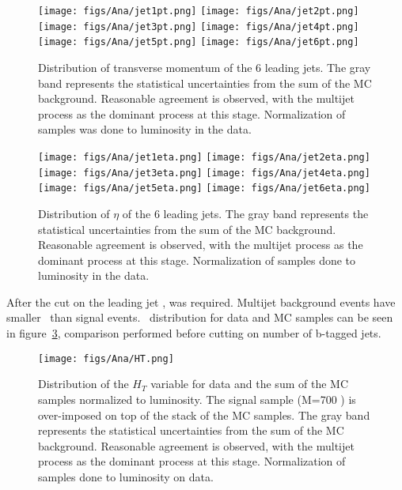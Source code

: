 \begin{figure}[!Hhtbp]
  \begin{center}
    \texttt{[image: figs/Ana/jet1pt.png]}
    \texttt{[image: figs/Ana/jet2pt.png]}
    \texttt{[image: figs/Ana/jet3pt.png]}
    \texttt{[image: figs/Ana/jet4pt.png]}
    \texttt{[image: figs/Ana/jet5pt.png]}
    \texttt{[image: figs/Ana/jet6pt.png]}
    \caption{Distribution of transverse momentum of the 6 leading jets. The gray band represents the statistical uncertainties from the sum of the MC background. Reasonable agreement is observed, with the multijet process as the dominant process at this stage. Normalization of samples was done to luminosity in the data.}
    \label{fig:6jpt}
  \end{center}
\end{figure}

\begin{figure}[!Hhtbp]
  \begin{center}
    \texttt{[image: figs/Ana/jet1eta.png]}
    \texttt{[image: figs/Ana/jet2eta.png]}
    \texttt{[image: figs/Ana/jet3eta.png]}
    \texttt{[image: figs/Ana/jet4eta.png]}
    \texttt{[image: figs/Ana/jet5eta.png]}
    \texttt{[image: figs/Ana/jet6eta.png]}
    \caption{Distribution of $\eta$ of the 6 leading jets. The gray band represents the statistical uncertainties from the sum of the MC background. Reasonable agreement is observed, with the multijet process as the dominant process at this stage. Normalization of samples done to luminosity in the data.}
    \label{fig:6jeta}
  \end{center}
\end{figure}

After the cut on the leading jet \pt,  was required. Multijet background events have smaller \HT~than signal events. \HT~distribution for data and MC samples can be seen in figure~\ref{fig:HT}, comparison performed before cutting on number of b-tagged jets.

\begin{figure}[!Hhtbp]
  \begin{center}
    \texttt{[image: figs/Ana/HT.png]}
    \caption{Distribution of the $H_{T}$ variable for data and the sum of the MC samples normalized to luminosity. The signal sample (M=700 \GeVcc) is over-imposed on top of the stack of the MC samples. The gray band represents the statistical uncertainties from the sum of the MC background. Reasonable agreement is observed, with the multijet process as the dominant process at this stage. Normalization of samples done to luminosity on data.}
    \label{fig:HT}
  \end{center}
\end{figure}

